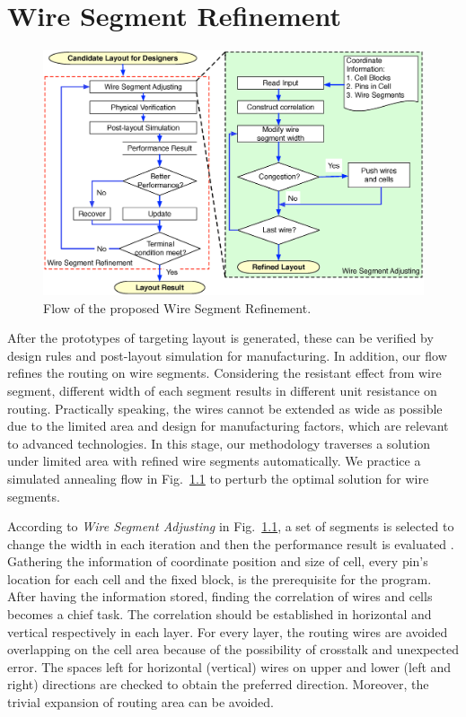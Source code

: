 \chapter{Wire Segment Refinement}\label{chap:WireSegRefine}

  \begin{figure}[t]
    \centering
    \includegraphics[width=\textwidth]{Fig/wireSegRefine.eps}
    \caption{Flow of the proposed Wire Segment Refinement.}
    \label{fig:WireSegRefine}
  \end{figure}
  
    


  After the prototypes of targeting layout is generated, these can be verified by design rules and post-layout simulation for manufacturing. In addition, our flow refines the routing on wire segments. Considering the resistant effect from wire segment, different width of each segment results in different unit resistance on routing. Practically speaking, the wires cannot be extended as wide as possible due to the limited area and design for manufacturing factors, which are relevant to advanced technologies. In this stage, our methodology traverses a solution under limited area with refined wire segments automatically. We practice a simulated annealing flow in Fig.~\ref{fig:WireSegRefine} to perturb the optimal solution for wire segments.

  
  

  According to {\it Wire Segment Adjusting} in Fig.~\ref{fig:WireSegRefine}, a set of segments is selected to change the width in each iteration and then the performance result is evaluated . Gathering the information of coordinate position and size of cell, every pin's location for each cell and the fixed block, is the prerequisite for the program. After having the information stored, finding the correlation of wires and cells becomes a chief task. The correlation should be established in horizontal and vertical respectively in each layer. For every layer, the routing wires are avoided overlapping on the cell area because of the possibility of crosstalk and unexpected error. The spaces left for horizontal (vertical) wires on upper and lower (left and right) directions are checked to obtain the preferred direction. Moreover, the trivial expansion of routing area can be avoided. 

